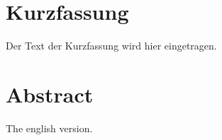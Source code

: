 \section*{Kurzfassung}
Der Text der Kurzfassung wird hier eingetragen. \blindtext


\begingroup
	
	\section*{Abstract}
	The english version. \blindtext
	
\endgroup

